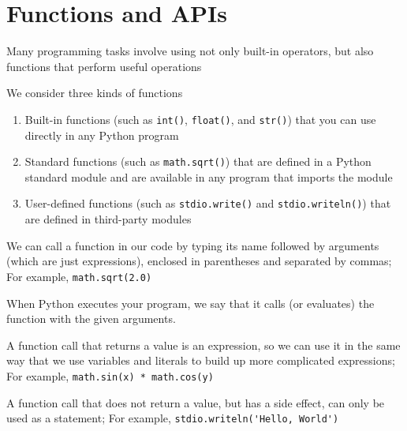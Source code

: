 \documentclass[8pt,a4paper,compress]{beamer}
\begin{document}
\section{Functions and APIs}
\begin{frame}[fragile]
\pause

Many programming tasks involve using not only built-in operators, but also functions that perform useful operations

\pause
\bigskip

We consider three kinds of functions
\begin{enumerate}
\item Built-in functions (such as \lstinline{int()}, \lstinline{float()}, and \lstinline{str()}) that you can use directly in any Python program

\item Standard functions (such as \lstinline{math.sqrt()}) that are defined in a Python standard module and are available in any program that imports the module

\item User-defined functions (such as \lstinline{stdio.write()} and \lstinline{stdio.writeln()}) that are defined in third-party modules
\end{enumerate}

\pause
\bigskip

We can call a function in our code by typing its name followed by arguments (which are just expressions), enclosed in parentheses and separated by commas; For example, \lstinline{math.sqrt(2.0)}

\pause
\bigskip

When Python executes your program, we say that it calls (or evaluates) the function with the given arguments.

\pause
\bigskip

A function call that returns a value is an expression, so we can use it in the same way that we use variables and literals to build up more complicated expressions; For example, \lstinline{math.sin(x) * math.cos(y)}

\pause
\bigskip

A function call that does not return a value, but has a side effect, can only be used as a statement; For example, \lstinline{stdio.writeln('Hello, World')}
\end{frame}
\end{document}
